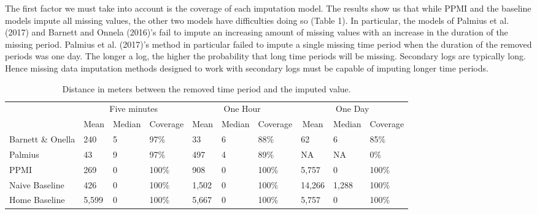 \documentclass[man]{apa6}
\makeatletter
\newenvironment{lltable}
  {\begin{landscape}\begin{center}\begin{ThreePartTable}}
  {\end{ThreePartTable}\end{center}\end{landscape}}
\newcommand\LastLTentrywidth{1em}
\newlength\longtablewidth
\newcommand\getlongtablewidth{%
 \begingroup
  \ifcsname LT@\roman{LT@tables}\endcsname
  \global\longtablewidth=0pt
  \renewcommand\LT@entry[2]{\global\advance\longtablewidth by ##2\relax\gdef\LastLTentrywidth{##2}}%
  \@nameuse{LT@\roman{LT@tables}}%
  \fi
\endgroup}
\theoremstyle{definition}
\theoremstyle{definition}
\theoremstyle{definition}
\theoremstyle{remark}
\makeatother
\begin{document}
The first factor we must take into account is the coverage of each
imputation model. The results show us that while PPMI and the baseline
models impute all missing values, the other two models have difficulties
doing so (Table 1). In particular, the models of Palmius et al. (2017)
and Barnett and Onnela (2016)'s fail to impute an increasing amount of
missing values with an increase in the duration of the missing period.
Palmius et al. (2017)'s method in particular failed to impute a single
missing time period when the duration of the removed periods was one
day. The longer a log, the higher the probability that long time periods
will be missing. Secondary logs are typically long. Hence missing data
imputation methods designed to work with secondary logs must be capable
of imputing longer time periods.

\begin{lltable}
\begin{longtable}{llllllllll}\noalign{\getlongtablewidth\global\LTcapwidth=\longtablewidth}
\caption{\label{tab:resulttable}Distance in meters between the removed time period and the imputed value.}\\
\toprule
 & \multicolumn{3}{c}{Five minutes} & \multicolumn{3}{c}{One Hour} & \multicolumn{3}{c}{One Day} \\
\cmidrule(r){2-4} \cmidrule(r){5-7} \cmidrule(r){8-10}
 & \multicolumn{1}{c}{Mean} & \multicolumn{1}{c}{Median} & \multicolumn{1}{c}{Coverage} & \multicolumn{1}{c}{Mean} & \multicolumn{1}{c}{Median} & \multicolumn{1}{c}{Coverage} & \multicolumn{1}{c}{Mean} & \multicolumn{1}{c}{Median} & \multicolumn{1}{c}{Coverage}\\
\midrule
Barnett \& Onella & 240 & 5 & 97\% & 33 & 6 & 88\% & 62 & 6 & 85\%\\
Palmius & 43 & 9 & 97\% & 497 & 4 & 89\% & NA & NA & 0\%\\
PPMI & 269 & 0 & 100\% & 908 & 0 & 100\% & 5,757 & 0 & 100\%\\
Naive Baseline & 426 & 0 & 100\% & 1,502 & 0 & 100\% & 14,266 & 1,288 & 100\%\\
Home Baseline & 5,599 & 0 & 100\% & 5,667 & 0 & 100\% & 5,757 & 0 & 100\%\\
\bottomrule
\end{longtable}
\end{lltable}
\end{document}
